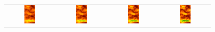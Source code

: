\begin{figure}[htb]
\begin {tabular}{@{}cccc@{}}
 \includegraphics[width=0.23\textwidth]{figures/VisitScreenshots/SPE1000/SPE1000_PERM_t05.png} &
 \includegraphics[width=0.23\textwidth]{figures/VisitScreenshots/SPE1000/SPE1000_PERM_t06.png} &
 \includegraphics[width=0.23\textwidth]{figures/VisitScreenshots/SPE1000/SPE1000_PERM_t07.png} &
 \includegraphics[width=0.23\textwidth]{figures/VisitScreenshots/SPE1000/SPE1000_PERM_t08.png} \\

\end{tabular}
\end{figure}
